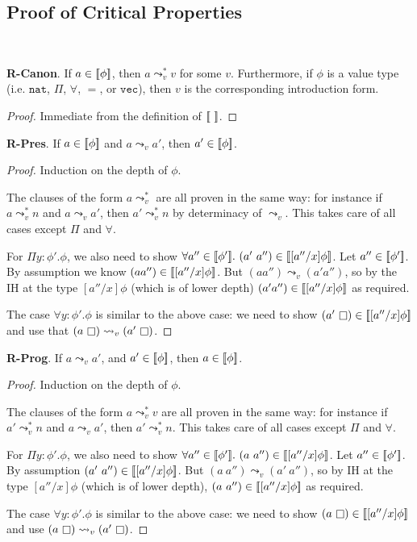 \documentclass[copyright]{eptcs}
\newcommand{\vc}[0]{\texttt{vec}}
\newcommand{\nat}[0]{\texttt{nat}}
\newcommand{\leadstov}[0]{\leadsto_v}
\newcommand{\impapp}[0]{\raisebox{-0.2ex}{$\square$}}
\newcommand{\interp}[1]{[\negthinspace[#1]\negthinspace]}
\begin{document}
\subsection{Proof of Critical Properties}

\

\noindent \textbf{R-Canon}. If $a\in\interp{\phi}$, then $a\leadstov^* v$ for some $v$. Furthermore,
if $\phi$ is a value type (i.e. $\nat$, $\Pi$, $\forall$, $=$, or $\vc$), then $v$ is the corresponding introduction form.

\begin{proof} Immediate from the definition of $\interp{\ }$.
\end{proof}

\noindent \textbf{R-Pres}. If $a\in\interp{\phi}$ and $a \leadstov a'$, then $a' \in \interp{\phi}$.

\begin{proof}Induction on the depth of $\phi$.

The clauses of the form $a \leadstov^*$ are all proven in the same way: for instance if $a \leadstov^* n$ and $a \leadstov a'$, then $a' \leadstov^* n$ by determinacy of $\leadstov$. This takes care of all cases except $\Pi$ and $\forall$.

For $\Pi y:\phi'.\phi$, we also need to show $\forall a''\in\interp{\phi'}.\ (a'\ a'')\in\interp{[a''/x]\phi}$. Let $a''\in\interp{\phi'}$. By assumption we know $(a a'') \in \interp{[a''/x]\phi}$. But $(a a'') \leadstov (a' a'')$, so by the IH at the type $[a''/x]\phi$ (which is of lower depth) $(a' a'') \in \interp{[a''/x]\phi}$ as required.

The case $\forall y:\phi'.\phi$ is similar to the above case: we need to show $(a'\ \impapp)\in\interp{[a''/x]\phi}$ and use that $(a\ \impapp) \leadstov (a'\ \impapp)$.
\end{proof}

\noindent \textbf{R-Prog}. If $a \leadstov a'$, and $a' \in \interp{\phi}$, then $a\in\interp{\phi}$.

\begin{proof}
Induction on the depth of $\phi$.

The clauses of the form $a \leadstov^* v$ are all proven in the same way: for instance if $a' \leadstov^* n$ and $a \leadstov a'$, then $a' \leadstov^* n$. This takes care of all cases except $\Pi$ and $\forall$.

For $\Pi y:\phi'.\phi$, we also need to show $\forall a''\in\interp{\phi'}.\ (a\ a'')\in\interp{[a''/x]\phi}$. Let $a''\in\interp{\phi'}$. By assumption $(a'\ a'') \in \interp{[a''/x]\phi}$. But $(a\ a'') \leadstov (a'\ a'')$, so by IH at the type $[a''/x]\phi$ (which is of lower depth), $(a\ a'') \in \interp{[a''/x]\phi}$ as required.

The case $\forall y:\phi'.\phi$ is similar to the above case: we need to show $(a\ \impapp) \in \interp{[a''/x]\phi}$ and use $(a\ \impapp) \leadstov (a'\ \impapp)$.

\end{proof}
\end{document}
